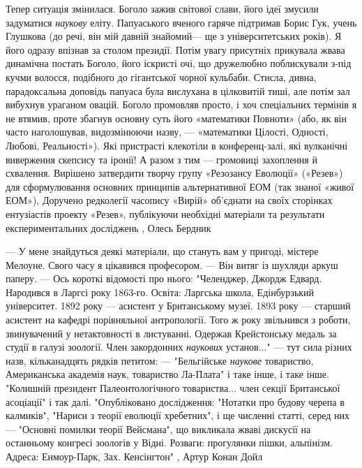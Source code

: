 Тепер ситуація змінилася. Боголо зажив світової слави, його ідеї змусили
задуматися \emph{наукову} еліту. Папуаського вченого гаряче підтримав Борис Гук, учень
Глушкова (до речі, він мій давній знайомий— ще з університетських років). Я
його одразу впізнав за столом президії. Потім увагу присутніх прикувала жвава
динамічна постать Боголо, його іскристі очі, що дружелюбно поблискували з-під
кучми волосся, подібного до гігантської чорної кульбаби.  Стисла, дивна,
парадоксальна доповідь папуаса була вислухана в цілковитій тиші, але потім зал
вибухнув ураганом овацій. Боголо промовляв просто, і хоч спеціальних термінів я
не втямив, проте збагнув основну суть його «математики Повноти» (або, як він
часто наголошував, видозмінюючи назву, — «математики Цілості, Одності, Любові,
Реальності»).  Які пристрасті клекотіли в конференц-залі, які вулканічні
виверження скепсису та іронії! А разом з тим — громовиці захоплення й
схвалення.  Вирішено затвердити творчу групу «Резозансу Еволюції» («Резев») для
сформулювання основних принципів альтернативної ЕОМ (так знаної «живої ЕОМ»),
Доручено редколегії часопису «Вирій» об’єднати на своїх сторінках ентузіастів
проекту «Резев», публікуючи необхідні матеріали та результати експериментальних
досліджень
, Олесь Бердник

— У мене знайдуться деякі матеріали, що стануть вам у пригоді, містере Мелоуне.
Свого часу я цікавився професором. — Він витяг із шухляди аркуш паперу. — Ось
короткі відомості про нього: "Челенджер, Джордж Едвард. Народився в Ларгсі року
1863-го. Освіта: Ларгська школа, Едінбурзький університет. 1892 року — асистент
у Британському музеї. 1893 року — старший асистент на кафедрі порівняльної
антропології. Того ж року звільнився з роботи, звинувачений у нетактовності в
листуванні. Одержав Крейстонську медаль за студії в галузі зоології. Член
закордонних \emph{наукових} установ..." — тут сила різних назв, кільканадцять рядків
петитом: — "Бельгійське \emph{наукове} товариство, Американська академія наук,
товариство Ла-Плата" і таке інше, і таке інше. "Колишній президент
Палеонтологічного товариства... член секції Британської асоціації" і так далі.
"Опубліковано дослідження: "Нотатки про будову черепа в калмиків", "Нариси з
теорії еволюції хребетних", і ще численні статті, серед них — "Основні помилки
теорії Вейсмана", що викликала жваві дискусії на останньому конгресі зоологів у
Відні. Розваги: прогулянки пішки, альпінізм. Адреса: Енмоур-Парк, Зах.
Кенсінгтон"
, Артур Конан Дойл
